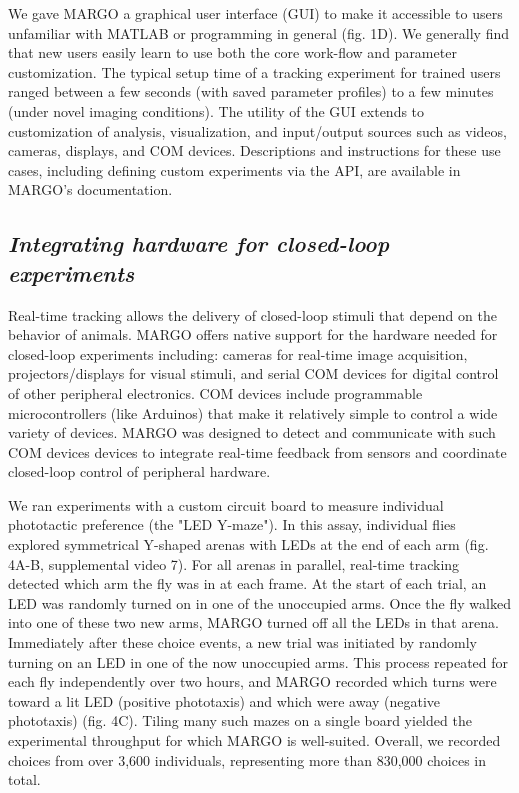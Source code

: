 \documentclass[10pt]{article}
\begin{document}
\begin{multicols}{2}
We gave MARGO a graphical user interface (GUI) to make it accessible to users unfamiliar with MATLAB or programming in general (fig. 1D). We generally find that new users easily learn to use both the core work-flow and parameter customization. The typical setup time of a tracking experiment for trained users ranged between a few seconds (with saved parameter profiles) to a few minutes (under novel imaging conditions). The utility of the GUI extends to customization of analysis, visualization, and input/output sources such as videos, cameras, displays, and COM devices. Descriptions and instructions for these use cases, including defining custom experiments via the API, are available in MARGO's documentation.

\subsection*{\textit{Integrating hardware for closed-loop experiments}}

Real-time tracking allows the delivery of closed-loop stimuli that depend on the behavior of animals. MARGO offers native support for the hardware needed for closed-loop experiments including: cameras for real-time image acquisition, projectors/displays for visual stimuli, and serial COM devices for digital control of other peripheral electronics. COM devices include programmable microcontrollers (like Arduinos) that make it relatively simple to control a wide variety of devices. MARGO was designed to detect and communicate with such COM devices devices to integrate real-time feedback from sensors and coordinate closed-loop control of peripheral hardware. 

We ran experiments with a custom circuit board to measure individual phototactic preference (the "LED Y-maze"). In this assay, individual flies explored symmetrical Y-shaped arenas with LEDs at the end of each arm (fig. 4A-B, supplemental video 7). For all arenas in parallel, real-time tracking detected which arm the fly was in at each frame. At the start of each trial, an LED was randomly turned on in one of the unoccupied arms. Once the fly walked into one of these two new arms, MARGO turned off all the LEDs in that arena. Immediately after these choice events, a new trial was initiated by randomly turning on an LED in one of the now unoccupied arms. This process repeated for each fly independently over two hours, and MARGO recorded which turns were toward a lit LED (positive phototaxis) and which were away (negative phototaxis) (fig. 4C). Tiling many such mazes on a single board yielded the experimental throughput for which MARGO is well-suited. Overall, we recorded choices from over 3,600 individuals, representing more than 830,000 choices in total.


\end{multicols}
\end{document}
